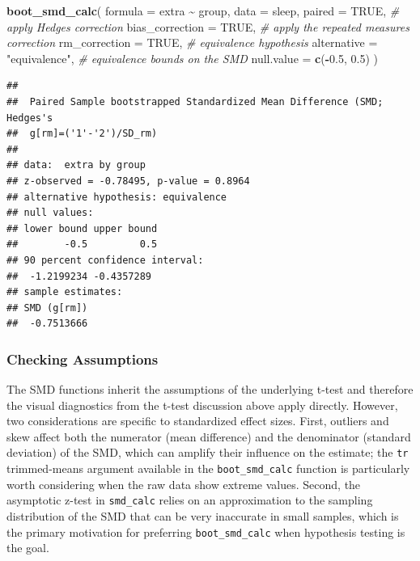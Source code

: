 \documentclass[]{interact}
\theoremstyle{plain}%
\theoremstyle{definition}
\theoremstyle{remark}
\newenvironment{Shaded}{\begin{snugshade}}{\end{snugshade}}
\newcommand{\AttributeTok}[1]{\textcolor[rgb]{0.13,0.29,0.53}{#1}}
\newcommand{\CommentTok}[1]{\textcolor[rgb]{0.56,0.35,0.01}{\textit{#1}}}
\newcommand{\ConstantTok}[1]{\textcolor[rgb]{0.56,0.35,0.01}{#1}}
\newcommand{\FloatTok}[1]{\textcolor[rgb]{0.00,0.00,0.81}{#1}}
\newcommand{\FunctionTok}[1]{\textcolor[rgb]{0.13,0.29,0.53}{\textbf{#1}}}
\newcommand{\NormalTok}[1]{#1}
\newcommand{\SpecialCharTok}[1]{\textcolor[rgb]{0.81,0.36,0.00}{\textbf{#1}}}
\newcommand{\StringTok}[1]{\textcolor[rgb]{0.31,0.60,0.02}{#1}}
\begin{document}
\begin{Shaded}
\begin{Highlighting}[]
\FunctionTok{boot\_smd\_calc}\NormalTok{(}
  \AttributeTok{formula =}\NormalTok{ extra }\SpecialCharTok{\textasciitilde{}}\NormalTok{ group,}
  \AttributeTok{data =}\NormalTok{ sleep,}
  \AttributeTok{paired =} \ConstantTok{TRUE}\NormalTok{,}
  \CommentTok{\# apply Hedges\textquotesingle{} correction}
  \AttributeTok{bias\_correction =} \ConstantTok{TRUE}\NormalTok{,}
  \CommentTok{\# apply the repeated measures correction}
  \AttributeTok{rm\_correction =} \ConstantTok{TRUE}\NormalTok{,}
  \CommentTok{\# equivalence hypothesis}
  \AttributeTok{alternative =} \StringTok{"equivalence"}\NormalTok{,}
  \CommentTok{\# equivalence bounds on the SMD}
  \AttributeTok{null.value =} \FunctionTok{c}\NormalTok{(}\SpecialCharTok{{-}}\FloatTok{0.5}\NormalTok{, }\FloatTok{0.5}\NormalTok{)}
\NormalTok{)}
\end{Highlighting}
\end{Shaded}

\begin{verbatim}
## 
##  Paired Sample bootstrapped Standardized Mean Difference (SMD; Hedges's
##  g[rm]=('1'-'2')/SD_rm)
## 
## data:  extra by group
## z-observed = -0.78495, p-value = 0.8964
## alternative hypothesis: equivalence
## null values:
## lower bound upper bound 
##        -0.5         0.5 
## 90 percent confidence interval:
##  -1.2199234 -0.4357289
## sample estimates:
## SMD (g[rm]) 
##  -0.7513666
\end{verbatim}

\subsubsection{Checking Assumptions}\label{checking-assumptions-1}

The SMD functions inherit the assumptions of the underlying t-test and
therefore the visual diagnostics from the t-test discussion above apply
directly. However, two considerations are specific to standardized
effect sizes. First, outliers and skew affect both the numerator (mean
difference) and the denominator (standard deviation) of the SMD, which
can amplify their influence on the estimate; the \texttt{tr}
trimmed-means argument available in the \texttt{boot\_smd\_calc}
function is particularly worth considering when the raw data show
extreme values. Second, the asymptotic z-test in \texttt{smd\_calc}
relies on an approximation to the sampling distribution of the SMD that
can be very inaccurate in small samples, which is the primary motivation
for preferring \texttt{boot\_smd\_calc} when hypothesis testing is the
goal.
\end{document}
